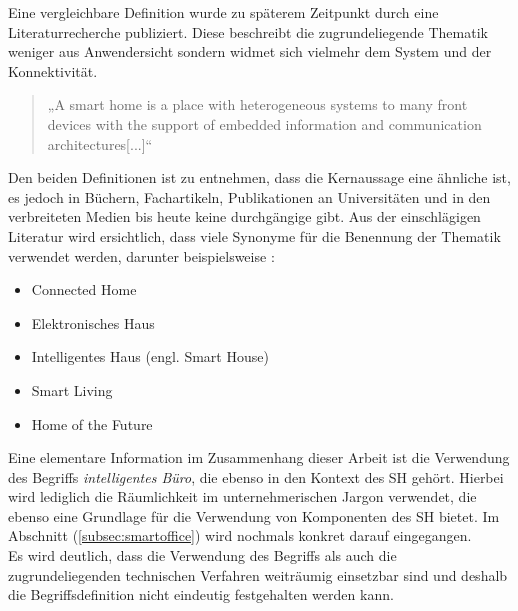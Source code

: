     Eine vergleichbare Definition wurde zu späterem Zeitpunkt durch eine Literaturrecherche publiziert. Diese beschreibt 
    die zugrundeliegende Thematik weniger aus Anwendersicht sondern widmet sich vielmehr dem System und der Konnektivität. 
    \begin{quote}
        „A smart home is a place with heterogeneous systems to many
        front devices with the support of embedded information and
        communication architectures[...]“ \cite{Balakrishnan2018}
    \end{quote}
    Den beiden Definitionen ist zu entnehmen, dass die Kernaussage eine ähnliche ist, es jedoch in Büchern, Fachartikeln, 
    Publikationen an Universitäten und in den verbreiteten Medien bis heute keine durchgängige gibt. Aus der
    einschlägigen Literatur wird ersichtlich, dass viele Synonyme für die Benennung der Thematik verwendet werden, darunter 
    beispielsweise \cite{strese.2010m}:
    \\
    \linebreak
    \linebreak
    \begin{itemize}
        \item Connected Home
        \item Elektronisches Haus
        \item Intelligentes Haus (engl. Smart House)
        \item Smart Living
        \item Home of the Future 
    \end{itemize}
    Eine elementare Information im Zusammenhang dieser Arbeit ist die Verwendung des Begriffs \textit{intelligentes Büro}, die 
    ebenso in den Kontext des \acl{SH} gehört. Hierbei wird lediglich die Räumlichkeit im unternehmerischen Jargon verwendet, 
    die ebenso eine Grundlage für die Verwendung von Komponenten des \acl{SH} bietet. Im Abschnitt (\ref{subsec:smartoffice}) wird 
    nochmals konkret darauf eingegangen.
    \\
    Es wird deutlich, dass die Verwendung des Begriffs als auch die zugrundeliegenden technischen Verfahren 
    weiträumig einsetzbar sind und deshalb die Begriffsdefinition nicht eindeutig festgehalten werden kann. 
    
